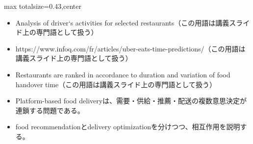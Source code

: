 \clearpage
{}
\begin{minipage}[t]{0.405\textwidth}
\begin{adjustbox}{max totalsize={\textwidth}{0.43\textheight},center}
\begin{minipage}{\textwidth}\scriptsize
{}\begin{itemize}
\item Analysis of driver‘s activities for selected restaurants（この用語は講義スライド上の専門語として扱う）
\item https://www.infoq.com/fr/articles/uber-eats-time-predictions/（この用語は講義スライド上の専門語として扱う）
\item Restaurants are ranked in accordance to duration and variation of food handover time（この用語は講義スライド上の専門語として扱う）
\end{itemize}\begin{itemize}
\item Platform-based food deliveryは、需要・供給・推薦・配送の複数意思決定が連鎖する問題である。
\item food recommendationとdelivery optimizationを分けつつ、相互作用を説明する。
\end{itemize}
\end{minipage}
\end{adjustbox}
\end{minipage}\hfill
